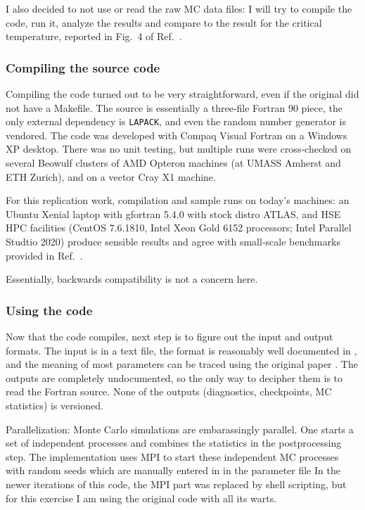 I also decided to not use or read the raw MC data files: I will try to 
compile the code, run it, analyze the results and compare to the result
for the critical temperature, reported in Fig.\ 4 of Ref.\ \cite{NJP:2006}.
 

\subsubsection{Compiling the source code}

Compiling the code turned out to be very straightforward, even if the original did not
have a Makefile. The source is essentially a three-file Fortran 90 piece,
the only external dependency is \texttt{LAPACK}, and even the random number generator
is vendored. The code was developed with Compaq Visual Fortran on a Windows XP
desktop. There was no unit testing, but multiple runs were cross-checked on several Beowulf
clusters of AMD Opteron machines (at UMASS Amherst and ETH Zurich), and on a vector
Cray X1 machine. 

For this replication work, compilation and sample runs on today's machines: an
Ubuntu Xenial laptop with gfortran 5.4.0 with stock distro ATLAS,
and HSE HPC facilities (CentOS 7.6.1810, Intel Xeon Gold 6152
processors; Intel Parallel Studtio 2020) produce sensible results and agree with
small-scale benchmarks provided in Ref.\ \cite{MCWA}. 

Essentially, backwards compatibility is not a concern here.

\subsubsection{Using the code}

Now that the code compiles, next step is to figure out the input and output
formats. The input is in a text file, the format is reasonably well documented
in \cite{MCWA}, and the meaning of most parameters can be traced using the 
original paper \cite{NJP:2006}. The outputs are completely undocumented, so the
only way to decipher them is to read the Fortran source. None
of the outputs (diagnostics, checkpoints, MC statistics) is versioned.

Parallelization: Monte Carlo simulations are embarassingly parallel. 
One starts a set of independent processes and 
combines the statistics in the postprocessing step. The implementation uses MPI
to start these independent MC processes with random seeds which are manually 
entered in in the parameter file
In the newer iterations of this code, the MPI part was replaced by shell
scripting, but for this exercise I am using the original code with all its warts.

